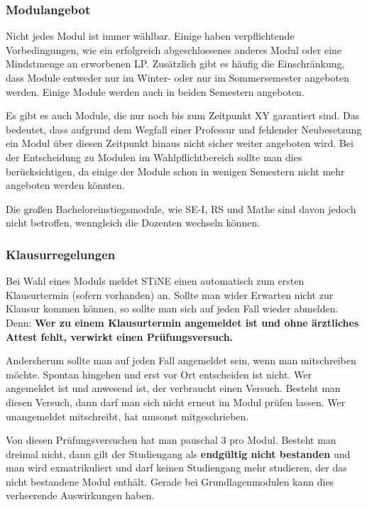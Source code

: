 \documentclass[a4paper,11pt]{scrartcl} %
\begin{document}
		\subsubsection*{Modulangebot}
		
		Nicht jedes Modul ist immer wählbar. Einige haben verpflichtende Vorbedingungen, wie ein erfolgreich abgeschlossenes anderes Modul oder eine Mindstmenge an erworbenen LP. Zusätzlich gibt es häufig die Einschränkung, dass Module entweder nur im Winter- oder nur im Sommersemester angeboten werden. Einige Module werden auch in beiden Semestern angeboten.
		
		Es gibt es auch Module, die nur noch bis zum Zeitpunkt XY garantiert sind. Das bedeutet, dass aufgrund dem Wegfall einer Professur und fehlender Neubesetzung ein Modul über diesen Zeitpunkt hinaus nicht sicher weiter angeboten wird. Bei der Entscheidung zu Modulen im Wahlpflichtbereich sollte man dies berücksichtigen, da einige der Module schon in wenigen Semestern nicht mehr angeboten werden könnten. 
		
		Die großen Bacheloreinstiegsmodule, wie SE-I, RS und Mathe sind davon jedoch nicht betroffen, wenngleich die Dozenten wechseln können.		
		
		\subsubsection*{Klausurregelungen}
		
		Bei Wahl eines Moduls meldet STiNE einen automatisch zum ersten Klausurtermin (sofern vorhanden) an. Sollte man wider Erwarten nicht zur Klausur kommen können, so sollte man sich auf jeden Fall wieder abmelden. Denn: \textbf{Wer zu einem Klausurtermin angemeldet ist und ohne ärztliches Attest fehlt, verwirkt einen Prüfungsversuch.} 

		Andersherum sollte man auf jeden Fall angemeldet sein, wenn man mitschreiben möchte. Spontan hingehen und erst vor Ort entscheiden ist nicht. Wer angemeldet ist und anwesend ist, der verbraucht einen Versuch. Besteht man diesen Versuch, dann darf man sich nicht erneut im Modul prüfen lassen. Wer unangemeldet mitschreibt, hat umsonst mitgeschrieben.
		
		Von diesen Prüfungsversuchen hat man pauschal 3 pro Modul. Besteht man dreimal nicht, dann gilt der Studiengang als \textbf{endgültig nicht bestanden} und man wird exmatrikuliert und darf keinen Studiengang mehr studieren, der das nicht bestandene Modul enthält. Gerade bei Grundlagenmodulen kann dies verheerende Auswirkungen haben.
		
\end{document}

